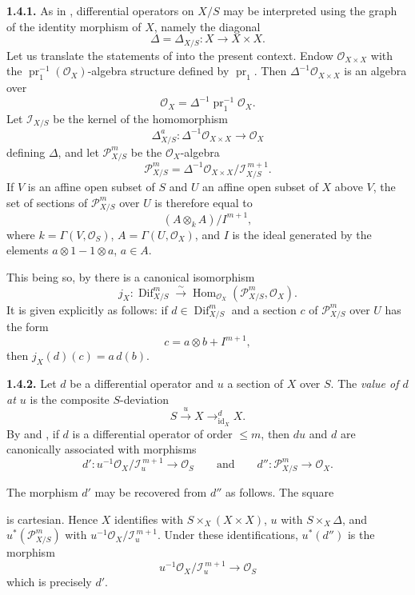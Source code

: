 \medskip
\noindent\textbf{1.4.1.}
\label{sga3:VIIA:1.4.1}
As in , differential operators on \(X/S\) may be interpreted using
the graph of the identity morphism of \(X\), namely the diagonal
\[
  \Delta=\Delta_{X/S}:X\longrightarrow X\times X.
\]
Let us translate the statements of  into the present context.
Endow \(\mathcal O_{X\times X}\) with the
\(\operatorname{pr}_1^{-1}(\mathcal O_X)\)-algebra structure defined
by \(\operatorname{pr}_1\). Then
\(\Delta^{-1}\mathcal O_{X\times X}\) is an algebra over
\[
  \mathcal O_X=\Delta^{-1}\operatorname{pr}_1^{-1}\mathcal O_X.
\]
Let \(\mathcal I_{X/S}\) be the kernel of the homomorphism
\[
 \Delta^a_{X/S}:\Delta^{-1}\mathcal O_{X\times X}
 \longrightarrow
 \mathcal O_X
\]
defining \(\Delta\), and let \(\mathcal P^m_{X/S}\) be the
\(\mathcal O_X\)-algebra
\[
  \mathcal P^m_{X/S}
  =
  \Delta^{-1}\mathcal O_{X\times X}/\mathcal I_{X/S}^{\,m+1}.
\]
If \(V\) is an affine open subset of \(S\) and \(U\) an affine open
subset of \(X\) above \(V\), the set of sections of
\(\mathcal P^m_{X/S}\) over \(U\) is therefore equal to
\[
  (A\otimes_kA)/I^{m+1},
\]
where \(k=\Gamma(V,\mathcal O_S)\), \(A=\Gamma(U,\mathcal O_X)\), and
\(I\) is the ideal generated by the elements \(a\otimes1-1\otimes a\),
\(a\in A\).

This being so, by  there is a canonical isomorphism
\[
 j_X:\operatorname{Dif}^m_{X/S}
 \xrightarrow{\sim}
 \operatorname{Hom}_{\mathcal O_X}
   (\mathcal P^m_{X/S},\mathcal O_X).
\]
It is given explicitly as follows: if
\(d\in\operatorname{Dif}^m_{X/S}\) and a section \(c\) of
\(\mathcal P^m_{X/S}\) over \(U\) has the form
\[
  c=a\otimes b+I^{m+1},
\]
then \(j_X(d)(c)=a\,d(b)\).

\medskip
\noindent\textbf{1.4.2.}
\label{sga3:VIIA:1.4.2}
Let \(d\) be a differential operator and \(u\) a section of \(X\) over
\(S\). The \emph{value of \(d\) at \(u\)} is the composite
\(S\)-deviation
\[
  S\xrightarrow{u}X
  \mathop{\longrightarrow}^{d}_{\operatorname{id}_X}X.
\]
By  and , if \(d\) is a differential operator of order \(\leq m\), then
\(du\) and \(d\) are canonically associated with morphisms
\[
 d':u^{-1}\mathcal O_X/\mathcal I_u^{\,m+1}\longrightarrow\mathcal O_S
 \qquad\text{and}\qquad
 d'':\mathcal P^m_{X/S}\longrightarrow\mathcal O_X.
\]

The morphism \(d'\) may be recovered from \(d''\) as follows. The square
\begin{center}
  \label{sga3:VIIA:1.4.2-value-cartesian-square}
  
\end{center}
is cartesian. Hence \(X\) identifies with
\(S\times_X(X\times X)\), \(u\) with \(S\times_X\Delta\), and
\(u^*(\mathcal P^m_{X/S})\) with
\(u^{-1}\mathcal O_X/\mathcal I_u^{\,m+1}\). Under these
identifications, \(u^*(d'')\) is the morphism
\[
  u^{-1}\mathcal O_X/\mathcal I_u^{\,m+1}\longrightarrow\mathcal O_S
\]
which is precisely \(d'\).

